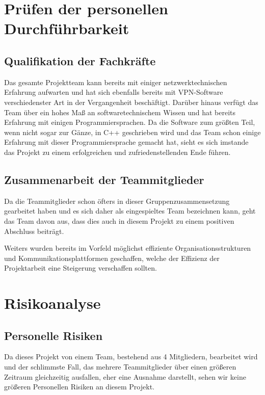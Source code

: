 \documentclass[a4paper,12pt]{scrreprt}
\begin{document}
	\section{Pr\"ufen der personellen Durchf\"uhrbarkeit}
		
		\subsection{Qualifikation der Fachkr\"afte}
			
		
	Das gesamte Projektteam kann bereits mit einiger netzwerktechnischen Erfahrung aufwarten und hat sich ebenfalls bereits mit VPN-Software verschiedenster Art in der Vergangenheit beschäftigt. Darüber hinaus verfügt das Team über ein hohes Maß an softwaretechnischem Wissen und hat bereits Erfahrung mit einigen Programmiersprachen. Da die Software zum größten Teil, wenn nicht sogar zur Gänze, in C++ geschrieben wird und das Team schon einige Erfahrung mit dieser Programmiersprache gemacht hat, sieht es sich imstande das Projekt zu einem erfolgreichen und zufriedenstellenden Ende führen.
	
		
		\subsection{Zusammenarbeit der Teammitglieder}
		
		
	Da die Teammitglieder schon öfters in dieser Gruppenzusammensetzung gearbeitet haben und es sich daher als eingespieltes Team bezeichnen kann, geht das Team davon aus, dass dies auch in diesem Projekt zu einem positiven Abschluss beiträgt.
	
	Weiters wurden bereits im Vorfeld möglichst effiziente Organisationsstrukturen und Kommunikationsplattformen geschaffen, welche der Effizienz der Projektarbeit eine Steigerung verschaffen sollten.
	
			
	\section{Risikoanalyse}
		
		\subsection{Personelle Risiken}
	Da dieses Projekt von einem Team, bestehend aus 4 Mitgliedern, bearbeitet wird und der schlimmste Fall, das mehrere Teammitglieder über einen größeren Zeitraum gleichzeitig ausfallen, eher eine  Ausnahme darstellt, sehen wir keine größeren Personellen Risiken an diesem Projekt.
	
\end{document}
